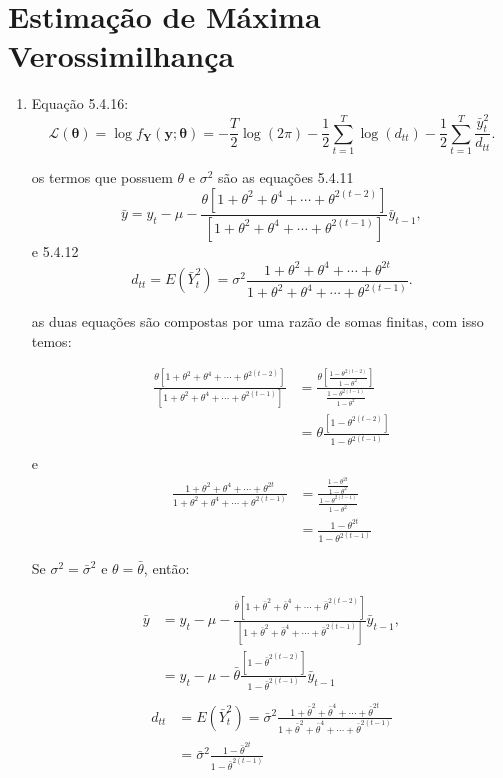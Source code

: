 \chapter{Estimação de Máxima Verossimilhança}


\begin{enumerate}
	\item[\fbox{5.1}]
	
	Equação 5.4.16: $$\mathscr{L}(\boldsymbol{\theta})=\log f_{\mathbf{Y}}(\mathbf{y};\boldsymbol{\theta})=-\frac{T}{2}\log (2\pi)-\frac{1}{2}\sum \limits_{t=1}^T\log (d_{tt})-\frac{1}{2}\sum \limits _{t=1}^T\frac{\bar{y}_t^2}{d_{tt}}.$$
	
	os termos que possuem $\theta$ e $\sigma^2$ são as equações 5.4.11
	$$\bar{y}=y_t-\mu-\frac{\theta[1+\theta^2+\theta^4+\cdots+\theta^{2(t-2)}]}{[1+\theta^2+\theta^4+\cdots+\theta^{2(t-1)}]}\bar{y}_{t-1},$$
	e 5.4.12
	$$d_{tt}=E(\bar{Y}_t^2)=\sigma^2\frac{1+\theta^2+\theta^4+\cdots+\theta^{2t}}{1+\theta^2+\theta^4+\cdots+\theta^{2(t-1)}}.$$
	
	as duas equações são compostas por uma razão de somas finitas, com isso temos:
	
	\begin{align*}
		\frac{\theta[1+\theta^2+\theta^4+\cdots+\theta^{2(t-2)}]}{[1+\theta^2+\theta^4+\cdots+\theta^{2(t-1)}]}&=\frac{\theta[\frac{1-\theta^{2(t-2)}}{1-\theta^2}]}{\frac{1-\theta^{2(t-1)}}{1-\theta^2}}\\
		&=\theta\frac{[1-\theta^{2(t-2)}]}{1-\theta^{2(t-1)}}\\
	\end{align*}
	e
	\begin{align*}
		\frac{1+\theta^2+\theta^4+\cdots+\theta^{2t}}{1+\theta^2+\theta^4+\cdots+\theta^{2(t-1)}}&=\frac{\frac{1-\theta^{2t}}{1-\theta^2}}{\frac{1-\theta^{2(t-1)}}{1-\theta^2}}\\
		&=\frac{1-\theta^{2t}}{1-\theta^{2(t-1)}}
	\end{align*}
	
	Se $\sigma^2=\bar{\sigma}^2$ e $\theta=\bar{\theta}$, então:
	
	
	\begin{align*}
	\bar{y}&=y_t-\mu-\frac{\bar{\theta}[1+\bar{\theta}^2+\bar{\theta}^4+\cdots+\bar{\theta}^{2(t-2)}]}{[1+\bar{\theta}^2+\bar{\theta}^4+\cdots+\bar{\theta}^{2(t-1)}]}\bar{y}_{t-1},\\
	&=y_t-\mu-\bar{\theta}\frac{[1-\bar{\theta}^{2(t-2)}]}{1-\bar{\theta}^{2(t-1)}}\bar{y}_{t-1}\\
	\end{align*}
	\begin{align*}
	d_{tt}&=E(\bar{Y}_t^2)=\bar{\sigma}^2\frac{1+\bar{\theta}^2+\bar{\theta}^4+\cdots+\bar{\theta}^{2t}}{1+\bar{\theta}^2+\bar{\theta}^4+\cdots+\bar{\theta}^{2(t-1)}}\\
	&=\bar{\sigma}^2\frac{1-\bar{\theta}^{2t}}{1-\bar{\theta}^{2(t-1)}}
	\end{align*}
	

\end{enumerate}
